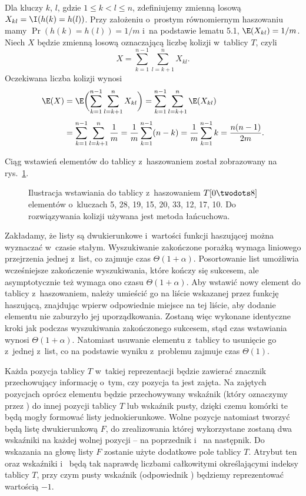 
\exercise %
Dla kluczy $k$, $l$, gdzie $1\le k<l\le n$, zdefiniujemy zmienną losową $X_{kl}=\I(h(k)=h(l))$.
Przy założeniu o~prostym równomiernym haszowaniu mamy $\Pr(h(k)=h(l))=1/m$ i~na podstawie lematu 5.1, $\E(X_{kl})=1/m$.
Niech $X$ będzie zmienną losową oznaczającą liczbę kolizji w~tablicy $T$, czyli
\[
    X = \sum_{k=1}^{n-1}\sum_{l=k+1}^nX_{kl}.
\]
Oczekiwana liczba kolizji wynosi
\begin{align*}
	\E(X) &= \E\biggl(\sum_{k=1}^{n-1}\sum_{l=k+1}^nX_{kl}\biggr) = \sum_{k=1}^{n-1}\sum_{l=k+1}^n\E(X_{kl}) \\[1mm]
	&= \sum_{k=1}^{n-1}\sum_{l=k+1}^n\frac{1}{m} = \frac{1}{m}\sum_{k=1}^{n-1}(n-k) = \frac{1}{m}\sum_{k=1}^{n-1}k = \frac{n(n-1)}{2m}.
\end{align*}

\exercise %
Ciąg wstawień elementów do tablicy z~haszowaniem został zobrazowany na rys.\ \ref{fig:11.2-2}.
\medskip
\begin{figure}[!ht]
	\centering 
	\caption{Ilustracja wstawiania do tablicy z~haszowaniem $T[0\twodots8]$ elementów o~kluczach 5, 28, 19, 15, 20, 33, 12, 17, 10.
Do rozwiązywania kolizji używana jest metoda łańcuchowa.} \label{fig:11.2-2}
\end{figure}

\exercise %
Zakładamy, że listy są dwukierunkowe i~wartości funkcji haszującej można wyznaczać w~czasie stałym.
Wyszukiwanie zakończone porażką wymaga liniowego przejrzenia jednej z~list, co zajmuje czas $\Theta(1+\alpha)$.
Posortowanie list umożliwia wcześniejsze zakończenie wyszukiwania, które kończy się sukcesem, ale asymptotycznie też wymaga ono czasu $\Theta(1+\alpha)$.
Aby wstawić nowy element do tablicy z~haszowaniem, należy umieścić go na liście wskazanej przez funkcję haszującą, znajdując wpierw odpowiednie miejsce na tej liście, aby dodanie elementu nie zaburzyło jej uporządkowania.
Zostaną więc wykonane identyczne kroki jak podczas wyszukiwania zakończonego sukcesem, stąd czas wstawiania wynosi $\Theta(1+\alpha)$.
Natomiast usuwanie elementu z~tablicy to usunięcie go z~jednej z~list, co na podstawie wyniku z~problemu  zajmuje czas $\Theta(1)$.

\exercise %
Każda pozycja tablicy $T$ w~takiej reprezentacji będzie zawierać znacznik przechowujący informację o~tym, czy pozycja ta jest zajęta.
Na zajętych pozycjach oprócz elementu będzie przechowywany wskaźnik (który oznaczymy przez ) do innej pozycji tablicy $T$ lub wskaźnik pusty, dzięki czemu komórki te będą mogły formować listy jednokierunkowe.
Wolne pozycje natomiast tworzyć będą listę dwukierunkową $F$, do zrealizowania której wykorzystane zostaną dwa wskaźniki na każdej wolnej pozycji --  na poprzednik i~ na następnik.
Do wskazania na głowę listy $F$ zostanie użyte dodatkowe pole tablicy $T$.
Atrybut ten oraz wskaźniki  i~ będą tak naprawdę liczbami całkowitymi określającymi indeksy tablicy $T$, przy czym pusty wskaźnik (odpowiednik ) będziemy reprezentować wartością $-1$.

